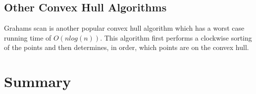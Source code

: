 \documentclass[11pt]{article}
\begin{document}
\subsection{Other Convex Hull Algorithms}
Grahams scan is another popular convex hull algorithm which has a worst case running time of $O(nlog(n))$. This algorithm first performs a clockwise sorting of the points and then determines, in order, which points are on the convex hull.

\section{Summary}

\nocite{Princeton:QH}



\end{document}

